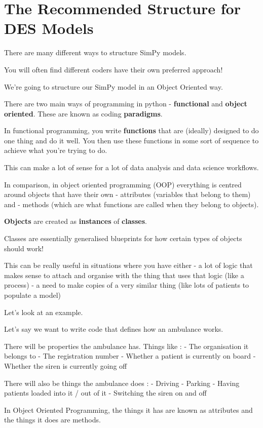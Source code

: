 \documentclass[
  letterpaper,
  DIV=11,
  numbers=noendperiod]{scrreprt}
\begin{document}
\chapter{The Recommended Structure for DES
Models}\label{the-recommended-structure-for-des-models}

There are many different ways to structure SimPy models.

You will often find different coders have their own preferred approach!

We're going to structure our SimPy model in an Object Oriented way.

\begin{tcolorbox}[enhanced jigsaw, rightrule=.15mm, colback=white, colframe=quarto-callout-note-color-frame, colbacktitle=quarto-callout-note-color!10!white, toprule=.15mm, coltitle=black, opacityback=0, titlerule=0mm, bottomtitle=1mm, breakable, title=\textcolor{quarto-callout-note-color}{\faInfo}\hspace{0.5em}{Note}, opacitybacktitle=0.6, toptitle=1mm, arc=.35mm, bottomrule=.15mm, leftrule=.75mm, left=2mm]

There are two main ways of programming in python - \textbf{functional}
and \textbf{object oriented}. These are known as coding
\textbf{paradigms}.

In functional programming, you write \textbf{functions} that are
(ideally) designed to do one thing and do it well. You then use these
functions in some sort of sequence to achieve what you're trying to do.

This can make a lot of sense for a lot of data analysis and data science
workflows.

In comparison, in object oriented programming (OOP) everything is
centred around objects that have their own - attributes (variables that
belong to them) and - methods (which are what functions are called when
they belong to objects).

\textbf{Objects} are created as \textbf{instances} of \textbf{classes}.

Classes are essentially generalised blueprints for how certain types of
objects should work!

This can be really useful in situations where you have either - a lot of
logic that makes sense to attach and organise with the thing that uses
that logic (like a process) - a need to make copies of a very similar
thing (like lots of patients to populate a model)

Let's look at an example.

Let's say we want to write code that defines how an ambulance works.

There will be properties the ambulance has. Things like : - The
organisation it belongs to - The registration number - Whether a patient
is currently on board - Whether the siren is currently going off

There will also be things the ambulance does : - Driving - Parking -
Having patients loaded into it / out of it - Switching the siren on and
off

In Object Oriented Programming, the things it has are known as
attributes and the things it does are methods.

\end{tcolorbox}
\end{document}

